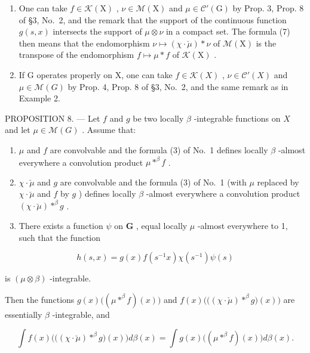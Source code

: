 \begin{enumerate}
\def\labelenumi{\arabic{enumi})}
\setcounter{enumi}{1}
\item
  One can take \(f \in \mathcal{K}(\mathrm{X})\) , \(\nu \in \mathcal{M}(\mathrm{X})\) and \(\mu \in \mathcal{C}'(\mathrm{G})\) by Prop. 3, Prop. 8 of §3, No.~2, and the remark that the support of the continuous function \(g(s,x)\) intersects the support of \(\mu \otimes \nu\) in a compact set. The formula (7) then means that the endomorphism \(\nu \mapsto (\chi \cdot \breve{\mu}) * \nu\) of \(\mathcal{M}(\mathrm{X})\) is the transpose of the endomorphism \(f \mapsto \mu * f\) of \(\mathcal{K}(\mathrm{X})\) .
\item
  If G operates properly on X, one can take \(f \in \mathcal{K}(X)\) , \(\nu \in \mathcal{C}'(X)\) and \(\mu \in \mathcal{M}(G)\) by Prop. 4, Prop. 8 of §3, No.~2, and the same remark as in Example 2.
\end{enumerate}

PROPOSITION 8. --- Let \(f\) and \(g\) be two locally \(\beta\) -integrable functions on \(X\) and let \(\mu \in \mathcal{M}(G)\) . Assume that:

\begin{enumerate}
\def\labelenumi{(\roman{enumi})}
\item
  \(\mu\) and \(f\) are convolvable and the formula (3) of No.~1 defines locally \(\beta\) -almost everywhere a convolution product \(\mu *^{\beta} f\) .
\item
  \(\chi \cdot \breve{\mu}\) and \(g\) are convolvable and the formula (3) of No.~1 (with \(\mu\) replaced by \(\chi \cdot \breve{\mu}\) and \(f\) by \(g\) ) defines locally \(\beta\) -almost everywhere a convolution product \((\chi \cdot \breve{\mu}) *^{\beta} g\) .
\item
  There exists a function \(\psi\) on \(\mathbf{G}\) , equal locally \(\mu\) -almost everywhere to 1, such that the function
\end{enumerate}

\[
h (s, x) = g (x) f \left(s ^ {- 1} x\right) \chi \left(s ^ {- 1}\right) \psi (s)
\]

is \((\mu \otimes \beta)\) -integrable.

Then the functions \(g(x)\big((\mu * ^ {\beta} f)(x)\big)\) and \(f(x)\big(\big((\chi \cdot \breve{\mu}) * ^ {\beta} g\big)(x)\big)\) are essentially \(\beta\) -integrable, and

\[
\int f (x) \big (\big ((\chi \cdot \breve {\mu}) * ^ {\beta} g \big) (x) \big) d \beta (x) = \int g (x) \big ((\mu * ^ {\beta} f) (x) \big) d \beta (x).\tag{8}
\]

